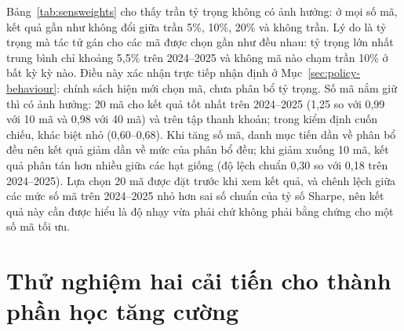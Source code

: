 Bảng~\ref{tab:sensweights} cho thấy trần tỷ trọng không có ảnh hưởng: ở mọi số mã, kết quả gần như không đổi giữa trần 5\%, 10\%, 20\% và không trần. Lý do là tỷ trọng mà tác tử gán cho các mã được chọn gần như đều nhau: tỷ trọng lớn nhất trung bình chỉ khoảng 5,5\% trên 2024--2025 và không mã nào chạm trần 10\% ở bất kỳ kỳ nào. Điều này xác nhận trực tiếp nhận định ở Mục~\ref{sec:policy-behaviour}: chính sách hiện mới chọn mã, chưa phân bổ tỷ trọng. Số mã nắm giữ thì có ảnh hưởng: 20 mã cho kết quả tốt nhất trên 2024--2025 (1,25 so với 0,99 với 10 mã và 0,98 với 40 mã) và trên tập thanh khoản; trong kiểm định cuốn chiếu, khác biệt nhỏ (0,60--0,68). Khi tăng số mã, danh mục tiến dần về phân bổ đều nên kết quả giảm dần về mức của phân bổ đều; khi giảm xuống 10 mã, kết quả phân tán hơn nhiều giữa các hạt giống (độ lệch chuẩn 0,30 so với 0,18 trên 2024--2025). Lựa chọn 20 mã được đặt trước khi xem kết quả, và chênh lệch giữa các mức số mã trên 2024--2025 nhỏ hơn sai số chuẩn của tỷ số Sharpe, nên kết quả này cần được hiểu là độ nhạy vừa phải chứ không phải bằng chứng cho một số mã tối ưu.

\section{Thử nghiệm hai cải tiến cho thành phần học tăng cường}
\label{sec:rlimprove}


